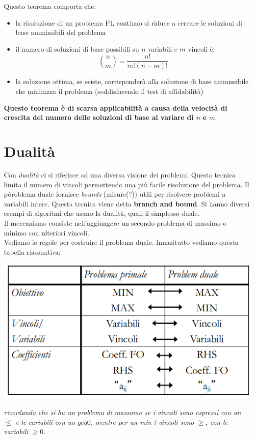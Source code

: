 \documentclass[a4paper,12pt, oneside]{book}
\begin{document}
Questo teorema comporta che:
\begin{itemize}
  \item la risoluzione di un problema PL continuo si riduce a cercare
  le soluzioni di base ammissibili del problema
  \item il numero di soluzioni di base possibili su $n$ variabili e
  $m$ vincoli è:
  \[{n\choose m}=\frac{n!}{m!(n-m)!}\]
  \item la soluzione ottima, se esiste, corrisponderà alla soluzione
  di base ammissibile che minimzza il problema (soddisfacendo il test
  di affidabilità)
\end{itemize}
\textbf{Questo teorema è di scarsa applicabilità a causa della
  velocità di crescita del numero delle soluzioni di base al variare
  di $n$ e $m$}
\chapter{Dualità}
Con \textit{dualità} ci si riferisce ad una diversa visione dei
problemi. Questa tecnica limita il numero di vincoli permettendo una
più facile risoluzione del problema. Il pòroblema duale fornisce
\textit{bounds} (misure(?)) utili per risolvere problemi a variabili
intere. Questa tecnica viene detta \textbf{branch and bound}. Si hanno
diversi esempi di algoritmi che usano la dualità, quali il simplesso
duale.\\
Il meccanismo consiste nell'aggiungere un secondo problema di massimo
o minimo con ulteriori vincoli.\\
Vediamo le regole per costruire il problema duale. Innazitutto vediamo
questa tabella riassuntiva:
\begin{center}
  \includegraphics[scale = 0.7]{img/dua.png}
\end{center}
\textit{ricordando che si ha un problema di massumo se i vincoli sono
  espressi con un $\leq$ e le cariabili con un $geq 0$, mentre per un
  min i vincoli sono $\geq$, con le variabili $\geq 0$}.\\
\end{document}
